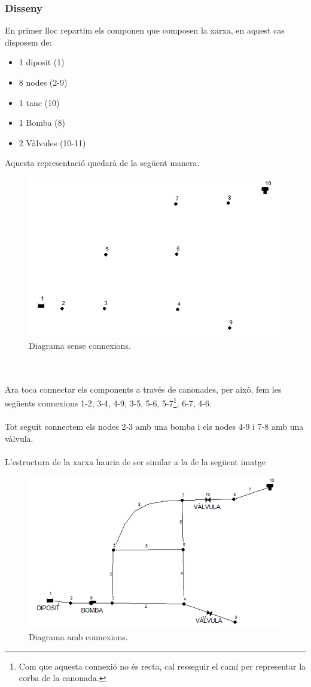 \documentclass[12pt]{article}
\begin{document}
\subsubsection{Disseny}
En primer lloc repartim els componen que composen la xarxa, en aquest cas disposem de:
\begin{itemize}
	\item 1 diposit (1)
	\item 8 nodes (2-9)
	\item 1 tanc (10)
	\item 1 Bomba (8)
	\item 2 Vàlvules (10-11)
\end{itemize}
Aquesta representació quedarà de la següent manera.
\begin{figure}[h!]
	\centering
	\includegraphics[scale=.7]{imatges/epanet/5.png}
	\caption{Diagrama sense connexions.}
\end{figure}
\\\\Ara toca connectar els components a través de canonades, per això, fem les següents connexions 1-2, 3-4, 4-9, 3-5, 5-6, 5-7\footnote{Com que aquesta connexió no és recta, cal resseguir el camí per representar la corba de la canonada.}, 6-7, 4-6. 
\\\\Tot seguit connectem els nodes 2-3 amb una bomba i els nodes 4-9 i 7-8 amb una vàlvula.
\\\\L'estructura de la xarxa hauria de ser similar a la de la següent imatge
\pagebreak
\begin{figure}[h!]
	\centering
	\includegraphics[scale=.6]{imatges/epanet/6.png}
	\caption{Diagrama amb connexions.}
\end{figure}
\end{document}
